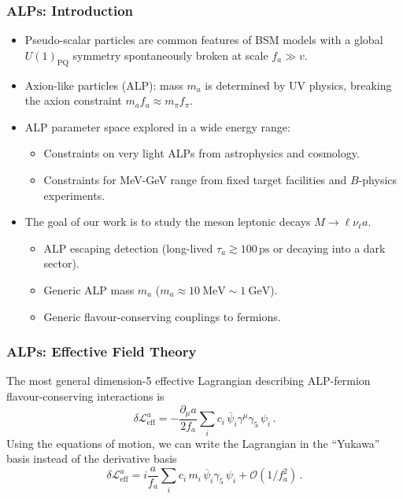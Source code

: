 \documentclass[mathserif, 10pt, dvipsnames]{beamer}
\begin{document}
\begin{frame}\frametitle{ALPs: Introduction}
    \begin{itemize}
        \item Pseudo-scalar particles are common features of BSM models with a global $U(1)_\mathrm{PQ}$ symmetry spontaneously broken at scale $f_a \gg v$.
        \item Axion-like particles (ALP): mass $m_a$ is determined by UV physics, breaking the axion constraint $m_a f_a \approx m_\pi f_\pi$.
        \item ALP parameter space explored in a wide energy range:
              \begin{itemize}
                  \item Constraints on very light ALPs from astrophysics and cosmology.
                  \item Constraints for MeV-GeV range from fixed target facilities and $B$-physics experiments.
              \end{itemize}
        \item The goal of our work is to study the meson leptonic decays $M\to \ell \nu_\ell a$.
              \begin{itemize}
                  \item ALP escaping detection (long-lived $\tau_a \gtrsim 100\,\mathrm{ps} $ or decaying into a dark sector).
                  \item Generic ALP mass $m_a$ ($m_a \approx 10\ \mathrm{MeV}\sim 1\ \mathrm{GeV}$).
                  \item Generic flavour-conserving couplings to fermions.
              \end{itemize}
    \end{itemize}
\end{frame}

\begin{frame}\frametitle{ALPs: Effective Field Theory}
    The most general dimension-5 effective Lagrangian describing ALP-fermion flavour-conserving interactions is
    $$ \delta \mathcal{L}^{a}_{\mathrm{eff}} =
        -\frac{\partial_\mu a}{ 2 f_a} \sum_{i} c_i \,\overline{\psi}_i \gamma^\mu \gamma_5 \,\psi_i\,. $$
    Using the equations of motion, we can write the Lagrangian in the ``Yukawa'' basis instead of the derivative basis
    $$\delta \mathcal{L}^{a}_{\mathrm{eff}} = i \frac{a}{f_a} \sum_{i}  c_i\, m_i \, \overline{\psi}_i \gamma_5 \,\psi_i + \mathcal{O}(1/f_a^2) \,.$$
\end{frame}
\end{document}
